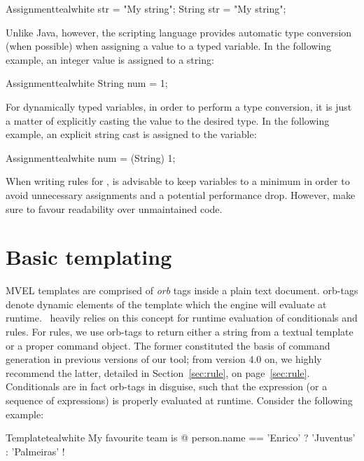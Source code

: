 \begin{codebox}{Assignment}{teal}{\icnote}{white}
str = "My string";
String str = "My string";
\end{codebox}

Unlike Java, however, the scripting language provides automatic type conversion (when possible) when assigning a value to a typed variable. In the following example, an integer value is assigned to a string:

\begin{codebox}{Assignment}{teal}{\icnote}{white}
String num = 1;
\end{codebox}

For dynamically typed variables, in order to perform a type conversion, it is just a matter of explicitly casting the value to the desired type. In the following example, an explicit string cast is assigned to the  variable:

\begin{codebox}{Assignment}{teal}{\icnote}{white}
num = (String) 1;
\end{codebox}

When writing rules for \arara, is advisable to keep variables to a minimum in order to avoid unnecessary assignments and a potential performance drop. However, make sure to favour readability over unmaintained code.

\section{Basic templating}
\label{sec:mvelbasictemplating}

\gls{MVEL} templates are comprised of \emph{orb} tags inside a plain text document. \Glspl{orb-tag} denote dynamic elements of the template which the engine will evaluate at runtime. \arara\ heavily relies on this concept for runtime evaluation of conditionals and rules. For rules, we use \glspl{orb-tag} to return either a string from a textual template or a proper command object. The former constituted the basis of command generation in previous versions of our tool; from version 4.0 on, we highly recommend the latter, detailed in Section~\ref{sec:rule}, on page~\ref{sec:rule}. Conditionals are in fact \glspl{orb-tag} in disguise, such that the expression (or a sequence of expressions) is properly evaluated at runtime. Consider the following example:

\begin{codebox}{Template}{teal}{\icnote}{white}
My favourite team is @{ person.name == 'Enrico'
? 'Juventus' : 'Palmeiras' }!
\end{codebox}

